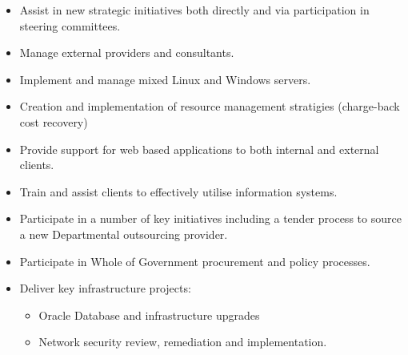 \documentclass[]{friggeri-cv} %
\begin{document}
\begin{entrylist}
{\begin{itemize}
\item Assist in new strategic initiatives both directly and via participation in steering committees.
\item Manage external providers and consultants.
\item Implement and manage mixed Linux and Windows servers.
\item Creation and implementation of resource management stratigies (charge-back cost recovery)
\item Provide support for web based applications to both internal and external clients.
\item Train and assist clients to effectively utilise information systems.
\item Participate in a number of key initiatives including a tender process to source a new Departmental outsourcing provider.
\item Participate in Whole of Government procurement and policy processes.
\item Deliver key infrastructure projects:
\begin{itemize}
\item Oracle Database and infrastructure upgrades
\item Network security review, remediation and implementation.
\end{itemize}
\end{itemize}}
\end{entrylist}
\end{document}
